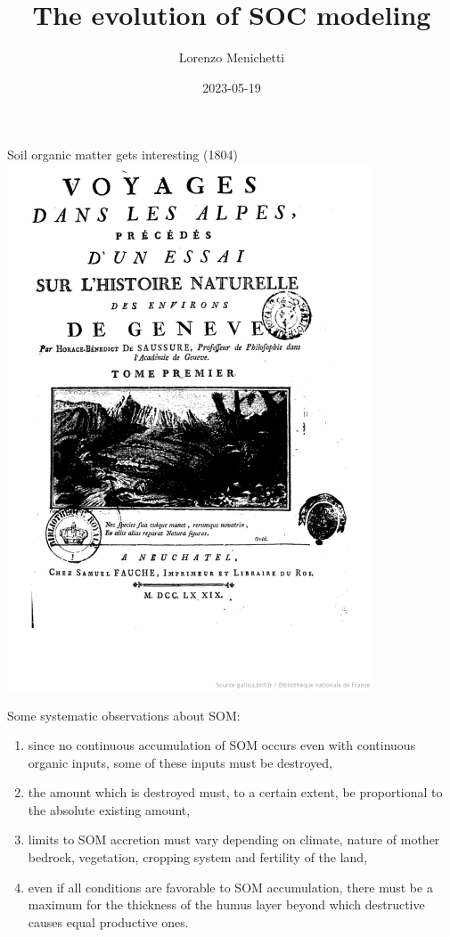 \documentclass[
  ignorenonframetext,
]{beamer}
\title{The evolution of SOC modeling}
\author{Lorenzo Menichetti}
\date{2023-05-19}
\providecommand{\tightlist}{%
  \setlength{\itemsep}{0pt}\setlength{\parskip}{0pt}}
\begin{document}
\frame{\titlepage}

\begin{frame}{Soil organic matter gets interesting (1804)}
\protect\hypertarget{soil-organic-matter-gets-interesting-1804}{}
\includegraphics[width=\textwidth,height=0.5\textheight]{Saussure.png}

Some systematic observations about SOM:

\begin{enumerate}
\tightlist
\item
  since no continuous accumulation of SOM occurs even with continuous
  organic inputs, some of these inputs must be destroyed,
\item
  the amount which is destroyed must, to a certain extent, be
  proportional to the absolute existing amount,
\item
  limits to SOM accretion must vary depending on climate, nature of
  mother bedrock, vegetation, cropping system and fertility of the land,
\item
  even if all conditions are favorable to SOM accumulation, there must
  be a maximum for the thickness of the humus layer beyond which
  destructive causes equal productive ones.
\end{enumerate}
\end{frame}
\end{document}
